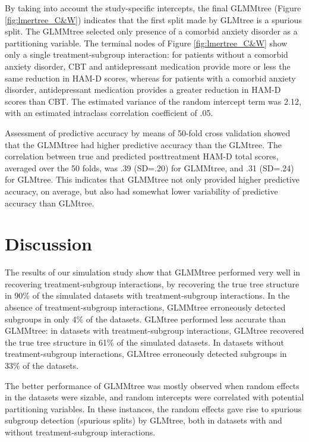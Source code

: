 \documentclass[nobf,doc]{apa}
\begin{document}
By taking into account the study-specific intercepts, the final GLMMtree (Figure \ref{fig:lmertree_C&W}) indicates that the first split made by GLMtree is a spurious split. The GLMMtree selected only presence of a comorbid anxiety disorder as a partitioning variable. The terminal nodes of Figure \ref{fig:lmertree_C&W} show only a single treatment-subgroup interaction: for patients without a comorbid anxiety disorder, CBT and antidepressant medication provide more or less the same reduction in HAM-D scores, whereas for patients with a comorbid anxiety disorder, antidepressant medication provides a greater reduction in HAM-D scores than CBT. The estimated variance of the random intercept term was 2.12, with an estimated intraclass correlation coefficient of .05. 

Assessment of predictive accuracy by means of 50-fold cross validation showed that the GLMMtree had higher predictive accuracy than the GLMtree. The correlation between true and predicted posttreatment HAM-D total scores, averaged over the 50 folds, was .39 (SD=.20) for GLMMtree, and .31 (SD=.24) for GLMtree. This indicates that GLMMtree not only provided higher predictive accuracy, on average, but also had somewhat lower variability of predictive accuracy than GLMtree. 




\section{Discussion}

The results of our simulation study show that GLMMtree performed very well in recovering treatment-subgroup interactions, by recovering the true tree structure in 90\% of the simulated datasets with treatment-subgroup interactions. In the absence of treatment-subgroup interactions, GLMMtree erroneously detected subgroups in only 4\% of the datasets. GLMtree performed less accurate than GLMMtree: in datasets with treatment-subgroup interactions, GLMtree recovered the true tree structure in 61\% of the simulated datasets. In datasets without treatment-subgroup interactions, GLMtree erroneously detected subgroups in 33\% of the datasets. 

The better performance of GLMMtree was mostly observed when random effects in the datasets were sizable, and random intercepts were correlated with potential partitioning variables. In these instances, the random effects gave rise to spurious subgroup detection (spurious splits) by GLMtree, both in datasets with and without treatment-subgroup interactions. 
\end{document}
